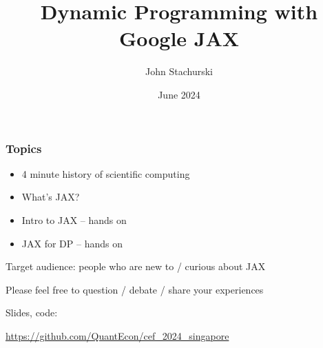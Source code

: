 \documentclass[
    xcolor={svgnames,dvipsnames},
    hyperref={colorlinks, citecolor=DeepPink4, linkcolor=DarkRed, urlcolor=DarkBlue}
    ]{beamer}  %
\title{Dynamic Programming with Google JAX}
\author{John Stachurski}
\date{June 2024}
\newcommand{\1}{\mathbbm 1}
\begin{document}
\begin{frame}
  \titlepage
\end{frame}



\begin{frame}
    \frametitle{Topics}

    \begin{itemize}
        \item 4 minute history of scientific computing
    \vspace{0.5em}
        \item What's JAX?
    \vspace{0.5em}
        \item Intro to JAX  -- hands on
    \vspace{0.5em}
        \item JAX for DP  -- hands on
    \end{itemize}


    \vspace{0.5em}
    \vspace{0.5em}
    \vspace{0.5em}
    Target audience: people who are new to / curious about JAX
    \vspace{0.5em}
    \vspace{0.5em}
    \vspace{0.5em}

    Please feel free to question / debate / share your experiences

\end{frame}


\begin{frame}
    
    Slides, code:

    \vspace{0.5em}
    \vspace{0.5em}
    \vspace{0.5em}
    \begin{center}
    \url{https://github.com/QuantEcon/cef_2024_singapore}
    \end{center}

\end{frame}
\end{document}
